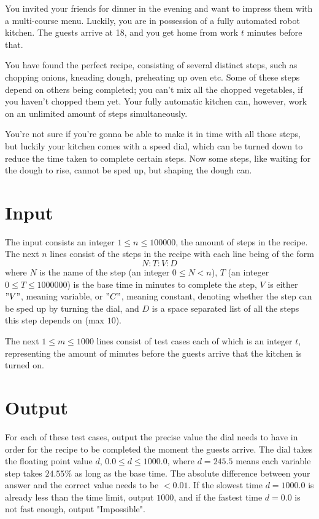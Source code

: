 

You invited your friends for dinner in the evening and want to impress them with a multi-course menu. Luckily, you are in possession of a fully automated robot kitchen. The guests arrive at 18, and you get home from work $t$ minutes before that. 

You have found the perfect recipe, consisting of several distinct steps, such as chopping onions, kneading dough, preheating up oven etc. Some of these steps depend on others being completed; you can't mix all the chopped vegetables, if you haven't chopped them yet. Your fully automatic kitchen can, however, work on an unlimited amount of steps simultaneously.

You're not sure if you're gonna be able to make it in time with all those steps, but luckily your kitchen comes with a speed dial, which can be turned down to reduce the time taken to complete certain steps. Now some steps, like waiting for the dough to rise, cannot be sped up, but shaping the dough can.


\section*{Input}

The input consists an integer $1 \leq n \leq 100000$, the amount of steps in the recipe. The next $n$ lines consist of the steps in the recipe with each line being of the form 
$$
N:T:V:D
$$
where $N$ is the name of the step (an integer $0 \leq N < n$), $T$ (an integer $0 \leq T \leq 1000000$) is the base time in minutes to complete the step, $V$ is either $"V"$, meaning variable, or $"C"$, meaning constant, denoting whether the step can be sped up by turning the dial, and $D$ is a space separated list of all the steps this step depends on (max $10$).

The next $1 \leq m \leq 1000$ lines consist of test cases each of which is an integer $t$, representing the amount of minutes before the guests arrive that the kitchen is turned on. 


\section*{Output}

For each of these test cases, output the precise value the dial needs to have in order for the recipe to be completed the moment the guests arrive. The dial takes the floating point value $d$, $0.0 \leq d \leq 1000.0$, where $d=245.5$ means each variable step takes $24.55\%$ as long as the base time. The absolute difference between your answer and the correct value needs to be $<0.01$. If the slowest time $d = 1000.0$ is already less than the time limit, output $1000$, and if the fastest time $d = 0.0$ is not fast enough, output "Impossible". 